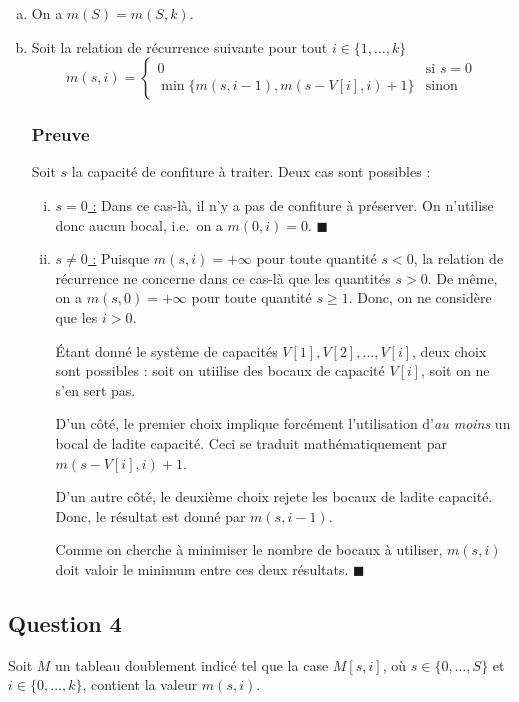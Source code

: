 \documentclass[12pt,a4paper]{article}
\begin{document}
\begin{enumerate}[a)]
\item On a \( m(S) = m(S,k)\).

\item Soit la relation de r\'ecurrence suivante pour tout $ i \in \{1,\dotsc,k\} $
\[
m(s,i) = 
\begin{cases}
0 & \text{si } s = 0 \\
\min \{m(s,i-1),m(s-V[i],i)+1\} & \text{sinon}
\end{cases}
\]

\subsubsection*{Preuve}
Soit $s$ la capacit\'e de confiture \`a traiter. Deux cas sont possibles :
\begin{enumerate}[i)]
 \item \underline{$s = 0$ :} Dans ce cas-l\`a, il n'y a pas de confiture \`a pr\'eserver. On n'utilise donc aucun bocal, i.e.\ on a $m(0,i) = 0$. \hfill\ensuremath{\blacksquare}
 \item \underline{$s \neq 0$ :} Puisque $m(s,i) = +\infty$ pour toute quantit\'e $s < 0$, la relation de r\'ecurrence ne concerne dans ce cas-l\`a que les quantit\'es $s > 0$. De m\^eme, on a $m(s,0) = +\infty$ pour toute quantit\'e $s \geq 1$. Donc, on ne consid\`ere que les $i > 0$.
 
\'Etant donn\'e le syst\`eme de capacit\'es $V[1], V[2], \dotsc, V[i]$, deux choix sont possibles : soit on utiilise des bocaux de capacit\'e $V[i]$, soit on ne s'en sert pas. 

D'un c\^ot\'e, le premier choix implique forc\'ement l'utilisation d'{\itshape au moins} un bocal de ladite capacit\'e. Ceci se traduit math\'ematiquement par $m(s-V[i],i)+1$. 

D'un autre c\^ot\'e, le deuxi\`eme choix rejete les bocaux de ladite capacit\'e. Donc, le r\'esultat est donn\'e par $m(s,i-1)$.

Comme on cherche \`a minimiser le nombre de bocaux \`a utiliser, $m(s,i)$ doit valoir le minimum entre ces deux r\'esultats. \hfill\ensuremath{\blacksquare}
\end{enumerate}
\end{enumerate}

\subsection*{Question 4}
Soit $M$ un tableau doublement indic\'e tel que la case $M[s,i]$, o\`u $s \in \{0,\dotsc,S\}$ et $i \in \{0,\dotsc,k\}$, contient la valeur $m(s,i)$.
\end{document}
